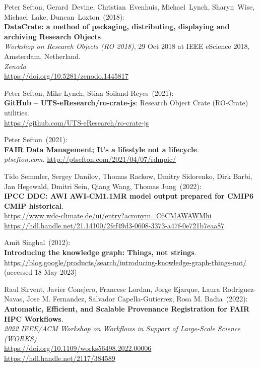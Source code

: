 \begin{thebibliography}{9}
Peter Sefton, Gerard~Devine, Christian~Evenhuis, Michael~Lynch, Sharyn~Wise,
Michael~Lake, Duncan~Loxton~(2018): \\
\textbf{DataCrate: a method of packaging, distributing, displaying and
archiving Research Objects}.\\
\emph{Workshop on Research Objects (RO 2018)}, 29 Oct 2018 at IEEE eScience 2018, Amsterdam, Netherland. \\
\emph{Zenodo}\\
\url{https://doi.org/10.5281/zenodo.1445817}

Peter Sefton, Mike Lynch, Stian Soiland-Reyes~(2021): \\
\textbf{GitHub -- UTS-eResearch/ro-crate-js}: Research Object Crate (RO-Crate) utilities.\\
\url{https://github.com/UTS-eResearch/ro-crate-js}

Peter Sefton~(2021): \\
\textbf{FAIR Data Management; It's a lifestyle not a lifecycle}.\\
\emph{ptsefton.com}. \url{http://ptsefton.com/2021/04/07/rdmpic/}

Tido Semmler, Sergey Danilov, Thomas Rackow, Dmitry Sidorenko, Dirk
Barbi, Jan Hegewald, Dmitri Sein, Qiang Wang, Thomas Jung~(2022): \\
\textbf{IPCC DDC: AWI AWI-CM1.1MR model output prepared for CMIP6 CMIP
historical}. \\
\url{https://www.wdc-climate.de/ui/entry?acronym=C6CMAWAWMhi}\\
\url{https://hdl.handle.net/21.14100/2fcf49d3-0608-3373-a47f-0e721b7eaa87}

Amit Singhal~(2012): \\
\textbf{Introducing the knowledge graph: Things, not strings}.\\
\url{https://blog.google/products/search/introducing-knowledge-graph-things-not/}
(accessed 18 May 2023)

Raul Sirvent, Javier Conejero, Francesc Lordan, Jorge Ejarque, Laura Rodriguez-Navas, Jose M. Fernandez, Salvador Capella-Gutierrez, Rosa M. Badia~(2022): \\
\textbf{Automatic, Efficient, and Scalable Provenance Registration for
FAIR HPC Workflows}.\\
\emph{2022 IEEE/ACM Workshop on Workflows in Support of Large-Scale Science (WORKS)}\\
\url{https://doi.org/10.1109/works56498.2022.00006}\\
\url{https://hdl.handle.net/2117/384589}


\end{thebibliography}
